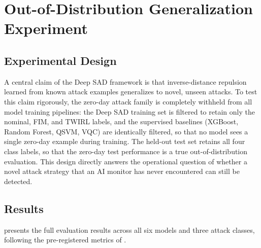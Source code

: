 \documentclass[12pt, a4paper]{report}
\begin{document}
\chapter{Out-of-Distribution Generalization Experiment}\label{ch:ood}

\section{Experimental Design}\label{sec:ood_design}
A central claim of the Deep SAD framework is that inverse-distance repulsion learned from known attack examples generalizes to novel, unseen attacks. To test this claim rigorously, the zero-day attack family is completely withheld from all model training pipelines: the Deep SAD training set is filtered to retain only the nominal, FIM, and TWIRL labels, and the supervised baselines (XGBoost, Random Forest, QSVM, VQC) are identically filtered, so that no model sees a single zero-day example during training. The held-out test set retains all four class labels, so that the zero-day test performance is a true out-of-distribution evaluation. This design directly answers the operational question of whether a novel attack strategy that an AI monitor has never encountered can still be detected.

\section{Results}\label{sec:ood_results}
 presents the full evaluation results across all six models and three attack classes, following the pre-registered metrics of .
\end{document}
